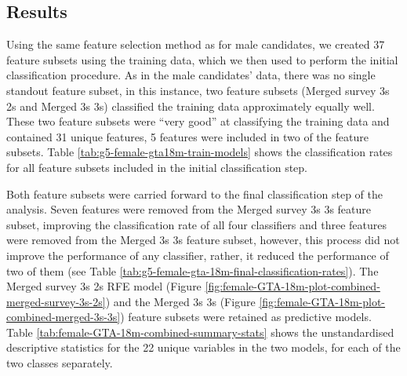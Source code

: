 \documentclass[
  12pt,
  a4paper,
]{book}
\begin{document}
\hypertarget{female-gta-results}{%
\subsection{Results}\label{female-gta-results}}

Using the same feature selection method as for male candidates, we created 37 feature subsets using the training data, which we then used to perform the initial classification procedure. As in the male candidates' data, there was no single standout feature subset, in this instance, two feature subsets (Merged survey 3s 2s and Merged 3s 3s) classified the training data approximately equally well. These two feature subsets were ``very good'' at classifying the training data and contained 31 unique features, 5 features were included in two of the feature subsets. Table \ref{tab:g5-female-gta18m-train-models} shows the classification rates for all feature subsets included in the initial classification step.

Both feature subsets were carried forward to the final classification step of the analysis. Seven features were removed from the Merged survey 3s 3s feature subset, improving the classification rate of all four classifiers and three features were removed from the Merged 3s 3s feature subset, however, this process did not improve the performance of any classifier, rather, it reduced the performance of two of them (see Table \ref{tab:g5-female-gta-18m-final-classification-rates}). The Merged survey 3s 2s RFE model (Figure \ref{fig:female-GTA-18m-plot-combined-merged-survey-3s-2s}) and the Merged 3s 3s (Figure \ref{fig:female-GTA-18m-plot-combined-merged-3s-3s}) feature subsets were retained as predictive models. Table \ref{tab:female-GTA-18m-combined-summary-stats} shows the unstandardised descriptive statistics for the 22 unique variables in the two models, for each of the two classes separately.

\end{document}
